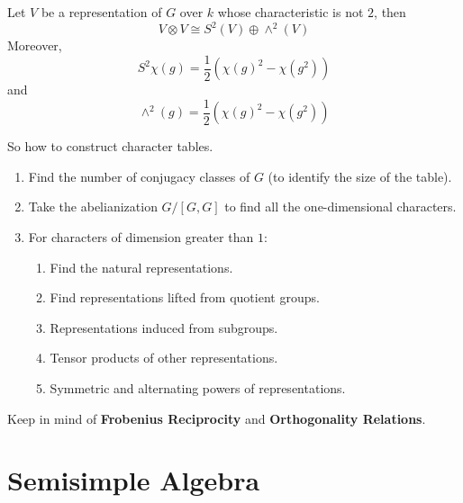 \documentclass[openany]{book}
\begin{document}
\begin{prop}
    Let $V$ be a representation of $G$ over $k$ whose characteristic is not $2$, then
    \begin{equation*}
        V\otimes V\cong S^2(V)\oplus\wedge^2(V)
    \end{equation*}
    Moreover, 
    \begin{equation*}
        S^2\chi(g)=\frac{1}{2}(\chi(g)^2-\chi(g^2))
    \end{equation*}
    and 
    \begin{equation*}
        \wedge^2(g)=\frac{1}{2}(\chi(g)^2-\chi(g^2))
    \end{equation*}
\end{prop}

\begin{warn}
    So how to construct character tables.
\end{warn}
\begin{prop}
    \begin{enumerate}
        \item Find the number of conjugacy classes of $G$ (to identify the size of the table).
        \item Take the abelianization $G/[G,G]$ to find all the one-dimensional characters.
        \item For characters of dimension greater than $1$: 
        \begin{enumerate}
            \item Find the natural representations.
            \item Find representations lifted from quotient groups.
            \item Representations induced from subgroups.
            \item Tensor products of other representations.
            \item Symmetric and alternating powers of representations.
        \end{enumerate}
    \end{enumerate}
    Keep in mind of \textbf{Frobenius Reciprocity} and \textbf{Orthogonality Relations}.
\end{prop}






























\chapter{Semisimple Algebra}


\newpage
\end{document}
